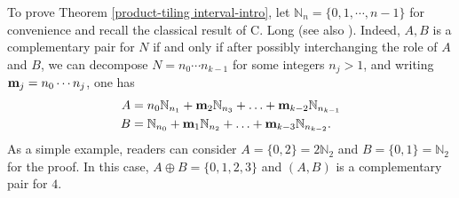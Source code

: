 \documentclass[reqno,a4paper,12pt]{amsart}
\numberwithin{equation}{section}
\newcommand{\N}{{\mathbb N}}
\newcounter{rem}
\theoremstyle{remark}
\numberwithin{equation}{section}
\def\N{\mathbb{N}}
\def\blue{\blue}
\def\blue#1{\textcolor[rgb]{0.00,0.00,1.00}{#1}}
\begin{document}
To prove Theorem \ref{product-tiling interval-intro}, let $\N_n = \{0,1,\cdots, n-1\}$ for convenience and recall the classical result of C. Long \cite{Long} (see also \cite[Corollary 2.6]{GL-2014}). Indeed,  $A,B$ is a complementary pair for $N$ if  and only if  after possibly interchanging the role of  $A$ and $B$, we can decompose $N = n_0\cdots n_{k-1}$ for some integers $n_j>1$, and writing ${\bf m}_j = n_0\cdots n_j$, one has
\begin{align}
   A &= n_0\N_{n_1}+ {\bf m}_2\N_{n_3}+\ldots+{\bf m}_{k-2}\N_{n_{k-1}}\nonumber\\
  B &= \N_{n_0}+{\bf m}_1\N_{n_2}+\ldots+{\bf m}_{k-3}\N_{n_{{k-2}}}.\nonumber 
\end{align}
  As a simple example, readers can consider $A = \{0,2\} = 2\N_2$ and $B = \{0, 1\} = \N_2$ for the proof. In this case, $A\oplus B = \{0,1,2,3\}$ and $(A,B)$ is a complementary pair for $4$.
\end{document}
